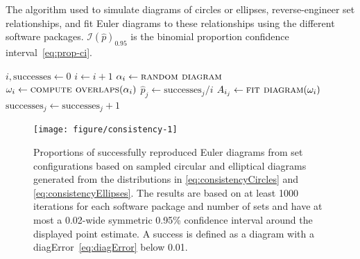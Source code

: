 \documentclass[
  oneside,
  openany,
  numbers=noendperiod,
  parskip=half,
  bibliography=totoc
]{scrbook}\usepackage[]{graphicx}\usepackage{xcolor}
\newenvironment{knitrout}{}{} %
\begin{document}
\begin{algorithm}[  hbtp]
\caption{The algorithm used to simulate diagrams of circles or ellipses,
reverse-engineer set relationships,
and fit Euler diagrams to these relationships using the different software packages.
$\mathcal{I}(\hat{p})_{0.95}$ is the binomial proportion confidence
interval~\eqref{eq:prop-ci}.\label{alg:consistency}}
\begin{algorithmic}
  \State $i, \text{successes} \gets 0$
  \Do
    \State $i \gets i + 1$
    \State $\alpha_i \gets \Call{random diagram}{}$
    \State $\omega_i \gets \Call{compute overlaps}{\alpha_i}$
      \State $\hat{p}_j \gets \text{successes}_j/i$
        \State $A_{i_j} \gets \Call{fit diagram}{\omega_i}$
          \State $\text{successes}_j \gets \text{successes}_j + 1$
        \EndIf
      \EndIf
    \EndFor
\EndFor
\end{algorithmic}
\end{algorithm}

\begin{figure}[bhtp]
\begin{knitrout}\small
{}\color{fgcolor}

{\centering \texttt{[image: figure/consistency-1]} 

}



\end{knitrout}
\caption{Proportions of successfully reproduced Euler diagrams from
set configurations based on sampled circular and elliptical diagrams generated from the
distributions in \eqref{eq:consistencyCircles} and \eqref{eq:consistencyEllipses}.
The results are based on at least 1000 iterations for each
software package and number of sets and have at most a 0.02-wide
symmetric 0.95\% confidence interval around the displayed point estimate. A
success is defined as a diagram with a diagError~\eqref{eq:diagError} below
0.01.}
\label{fig:consistency}
\end{figure}
\end{document}
